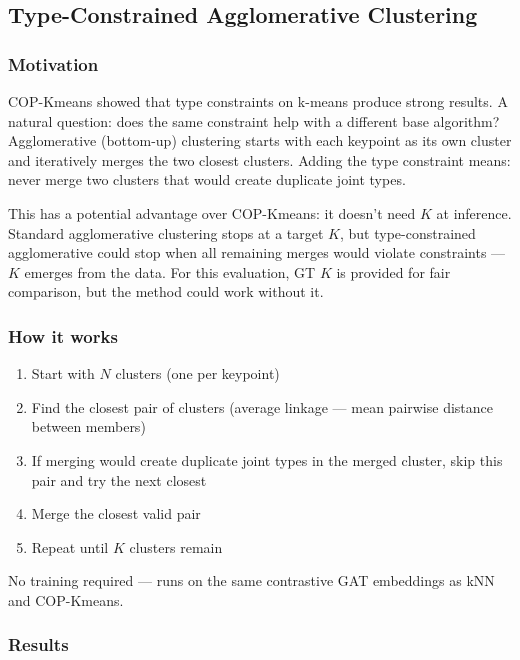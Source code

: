 \subsection{Type-Constrained Agglomerative Clustering}

\subsubsection{Motivation}

COP-Kmeans showed that type constraints on k-means produce strong results. A natural question: does the same constraint help with a different base algorithm? Agglomerative (bottom-up) clustering starts with each keypoint as its own cluster and iteratively merges the two closest clusters. Adding the type constraint means: never merge two clusters that would create duplicate joint types.

This has a potential advantage over COP-Kmeans: it doesn't need $K$ at inference. Standard agglomerative clustering stops at a target $K$, but type-constrained agglomerative could stop when all remaining merges would violate constraints --- $K$ emerges from the data. For this evaluation, GT $K$ is provided for fair comparison, but the method could work without it.


\subsubsection{How it works}

\begin{enumerate}
  \item Start with $N$ clusters (one per keypoint)
  \item Find the closest pair of clusters (average linkage --- mean pairwise distance between members)
  \item If merging would create duplicate joint types in the merged cluster, skip this pair and try the next closest
  \item Merge the closest valid pair
  \item Repeat until $K$ clusters remain
\end{enumerate}

No training required --- runs on the same contrastive GAT embeddings as kNN and COP-Kmeans.


\subsubsection{Results}

